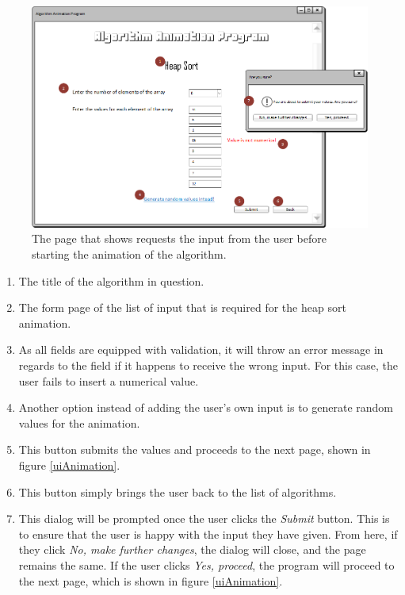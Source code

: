 \begin{figure}[H]
\centering
\hspace*{-0.5cm}
\includegraphics[scale=0.7]{images/report_images/uiInputAnimation.png}
\caption{The page that shows requests the input from the user before starting the animation of the algorithm.}
\label{uiInputAnimation}
\end{figure}

\begin{enumerate}
\item The title of the algorithm in question.
\item The form page of the list of input that is required for the heap sort animation.
\item As all fields are equipped with validation, it will throw an error message in regards to the field if it happens to receive the wrong input. For this case, the user fails to insert a numerical value.
\item Another option instead of adding the user's own input is to generate random values for the animation.
\item This button submits the values and proceeds to the next page, shown in figure \ref{uiAnimation}.
\item This button simply brings the user back to the list of algorithms.
\item This dialog will be prompted once the user clicks the \textit{Submit} button. This is to ensure that the user is happy with the input they have given. From here, if they click \textit{No, make further changes}, the dialog will close, and the page remains the same. If the user clicks \textit{Yes, proceed}, the program will proceed to the next page, which is shown in figure \ref{uiAnimation}.
\end{enumerate}

